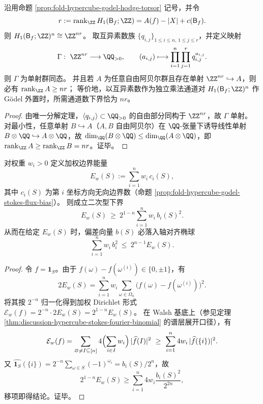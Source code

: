 \begin{proposition}\label{prop:fold-hypercube-h1-prime-budget-minimal}
沿用命题 \ref{prop:fold-hypercube-godel-hodge-torsor} 记号，并令
\[
r:=\operatorname{rank}_{\ZZ}H_1(\mathsf B_f;\ZZ)=A(f)-|X|+c(\mathsf B_f).
\]
则 \(H_1(\mathsf B_f;\ZZ)^n\cong \ZZ^{nr}\)。
取互异素数族 \(\{q_{i,j}\}_{1\le i\le n,\,1\le j\le r}\)，并定义映射
\[
\Gamma:\ \ZZ^{nr}\longrightarrow \QQ_{>0},
\qquad
(a_{i,j})\longmapsto \prod_{i=1}^n\prod_{j=1}^r q_{i,j}^{a_{i,j}}.
\]
则 \(\Gamma\) 为单射群同态。
并且若 \(A\) 为任意自由阿贝尔群且存在单射 \(\ZZ^{nr}\hookrightarrow A\)，则必有 \(\operatorname{rank}_{\ZZ}A\ge nr\)；
等价地，以互异素数作为独立乘法通道对 \(H_1(\mathsf B_f;\ZZ)^n\) 作 Gödel 外置时，所需通道数下界恰为 \(nr\)。
\end{proposition}
\begin{proof}
由唯一分解定理，\(\langle q_{i,j}\rangle\subset\QQ_{>0}\) 的自由部分同构于 \(\ZZ^{nr}\)，故 \(\Gamma\) 单射。
对最小性，任意单射 \(B\hookrightarrow A\)（\(A,B\) 自由阿贝尔）在 \(\QQ\)-张量下诱导线性单射 \(B\otimes\QQ\hookrightarrow A\otimes\QQ\)，故 \(\dim_{\QQ}(B\otimes\QQ)\le \dim_{\QQ}(A\otimes\QQ)\)，即 \(\operatorname{rank}_{\ZZ}A\ge \operatorname{rank}_{\ZZ}B=nr\)。证毕。
\end{proof}

\begin{proposition}[加权边界能量诱导的椭球约束]\label{prop:fold-hypercube-weighted-energy-ellipsoid-bias}
对权重 \(w_i>0\) 定义加权边界能量
\[
E_w(S):=\sum_{i=1}^n w_i\,c_i(S),
\]
其中 \(c_i(S)\) 为第 \(i\) 坐标方向无向边界数（命题 \ref{prop:fold-hypercube-godel-stokes-flux-bias}）。
则成立二次型下界
\[
\boxed{\;
E_w(S)\ \ge\ 2^{1-n}\sum_{i=1}^n w_i\,b_i(S)^2.
\;}
\]
从而在给定 \(E_w(S)\) 时，偏差向量 \(b(S)\) 必落入轴对齐椭球
\[
\sum_{i=1}^n w_i\,b_i^2\ \le\ 2^{n-1}E_w(S).
\]
\end{proposition}
\begin{proof}
令 \(f=\mathbf 1_S\)。由于 \(f(\omega)-f(\omega^{(i)})\in\{0,\pm 1\}\)，有
\[
2E_w(S)=\sum_{i=1}^n w_i\sum_{\omega\in\Omega_n}\bigl(f(\omega)-f(\omega^{(i)})\bigr)^2.
\]
将其按 \(2^{-n}\) 归一化得到加权 Dirichlet 形式
\(
\mathcal E_w(f)=2^{-n}\cdot 2E_w(S)=2^{1-n}E_w(S)
\)。
在 Walsh 基底上（参见定理 \ref{thm:discussion-hypercube-stokes-fourier-binomial} 的谱层展开口径），有
\[
\mathcal E_w(f)=\sum_{\varnothing\ne I\subseteq[n]}4\Bigl(\sum_{i\in I}w_i\Bigr)\,|\widehat f(I)|^2
\ \ge\
\sum_{i=1}^n 4w_i\,|\widehat f(\{i\})|^2.
\]
又 \(\widehat{\mathbf 1_S}(\{i\})=2^{-n}\sum_{\omega\in S}(-1)^{\omega_i}=b_i(S)/2^n\)，故
\[
2^{1-n}E_w(S)\ge \sum_{i=1}^n 4w_i\frac{b_i(S)^2}{2^{2n}},
\]
移项即得结论。证毕。
\end{proof}

